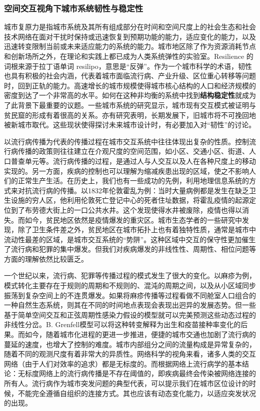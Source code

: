 \subsubsection{空间交互视角下城市系统韧性与稳定性}

城市复原力是指城市系统及其所有组成部分在时间和空间尺度上的社会生态和社会技术网络在面对干扰时保持或迅速恢复到预期功能的能力，适应变化的能力，以及迅速转变限制当前或未来适应能力的系统的能力\cite{meerow2016defining}。城市地区除了作为资源消耗节点和创新场所之外，在理论和实践上都已成为人类系统弹性的实验室\cite{meerow2016defining}。Resilience 的词根来源于拉丁语单词 resilipo，意思是“反弹”。作为一个城市科学的术语，韧性也具有积极的社会内涵，代表着城市面临流行病、产业升级、区位重心转移等问题时，回到正轨的能力\cite{mcevoy2013resilience, o2013deconstructing}。高速增长的城市规模使得城市核心结构的人口和经济规模的密度到达了一个非常高的水平。如何在这种非均衡的系统中找到\textbf{结构稳定性}就成为了此背景下最重要的议题。一些城市系统的研究显示，城市现有交互模式被证明与贫民窟的形成有着很高的关系\cite{brelsford2018toward}。亦有研究表明，长期发展下，旧城市将不可挽回地被新城市取代\cite{fujita1997structural, cottineau2017diverse}。这些现状使得探讨未来城市设计时，有必要加入对“韧性”的讨论。

以流行病传播为代表的传播过程在城市交互系统中往往体现出复杂的性质。控制流行病传播的政策则往往建立在介观尺度的空间范围，如小区、交通小区、街道、人口普查单元等。流行病传播的过程，是通过人与人交互以及人在各种尺度上的移动实现的\cite{belik2011natural}。另一方面，疾病的控制也可以理解为缩减疾患出现的区域，使之不影响人们的正常生产生活。在历史上，我们也有一些成功的先例，利用地理信息系统的方式来对抗流行病的传播。以1832年伦敦霍乱为例：当时大量病例都是发生在缺乏卫生设施的穷人区，他利用伦敦死亡登记中心的死者住址数据，将霍乱疫情的起源定位到了布劳德大街上的一口公共水井。这个发现使得水井被废除，疫情也得以消失。而如今，贫民地区依然是疫情爆发的重灾区\cite{sahasranaman2021spread}。城市生态学者的一些研究中发现，除了卫生条件差之外，贫民地区在城市拓扑上也有着独特性质，通常是城市中流动性最差的区域\cite{brelsford2018toward}，是城市交互系统的“势阱”。这种区域中交互的保守性更加催生了流行病和犯罪的集中爆发。但我们对疾病爆发的非线性性、周期性、相位问题等方面的理解依然比较匮乏\cite{dalziel2013human}。

一个世纪以来，流行病、犯罪等传播过程的模式发生了很大的变化。以麻疹为例，模式转化主要存在于规则的周期和不规则的、混沌的周期之间，以及从小区域同步振荡到复杂空间上的不连贯爆发。如果将麻疹传播等过程看做不同舱室人口组合的一种自然生态系统，则其在不同的时间地点表现会表现出迥异的发展态势。但一些基于简单空间交互和正弦周期性感染力假设的模型就可以完美预测这些动态过程的非线性分岔。B. Grenfell模型\cite{earn2000a}可以将这种转变解释为出生和疫苗接种率变化的后果。而如今，随着城市化进程的更进一步推进，便捷的城市交通也加剧了流行病的蔓延的速度，也增大了控制的难度。城市内部组分之间的流量构成是异常复杂的，随着不同的观测尺度有着非常大的异质性\cite{masucci2013gravity}。网络科学的视角来看，诸多人类的交互网络（由于人们对效率的追求）都是无标度的。而根据网络上流行病学的基本结论：无标度网络上的流行病传播是不存在阈值的，即疾病最终会传染被网络连接的所有人\cite{eguiluz2002epidemic, plucinski2013clusters}。流行病作为城市突发问题的典型代表，可以提示我们在城市区位设计的时候，不能完全遵循自组织的连接方式。其也应该有动态变化能力，以适应突发状况的出现。

